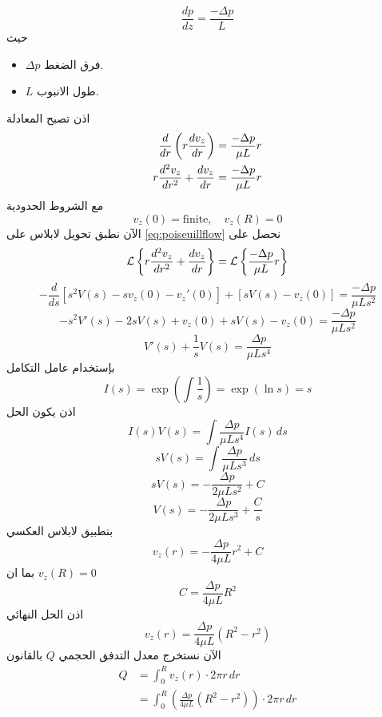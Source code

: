 \[
\frac{dp}{dz} = \frac{- \Delta p}{L}
\]
حيث 
\begin{itemize}
	\item $\Delta p$ فرق الضغط.
	\item  $L$ طول الانبوب.
\end{itemize}
اذن تصبح المعادلة 
\begin{align}
	\frac{d}{dr} \left(r \frac{dv_z}{dr}\right) = \frac{-\Delta p}{\mu L} r \notag\\
		\label{eq:poiseuillflow}
		r \frac{d^2 v_z}{dr^2} + \frac{dv_z}{dr} =  \frac{-\Delta p}{\mu L} r 
\end{align}
مع الشروط الحدودية
\[
v_z(0) = \text{finite}, \quad v_z(R) = 0
\]
الآن نطبق تحويل لابلاس على \eqref{eq:poiseuillflow} نحصل على
\[
\mathcal{L}\left\{r \frac{d^2 v_z}{dr^2} + \frac{dv_z}{dr}\right\} = \mathcal{L}\left\{\frac{-\Delta p}{\mu L} r\right\}
\]
\[
-\frac{d}{ds} \left[s^2 V(s) - s v_z(0) - v_z'(0)\right] + \left[sV(s) - v_z(0)\right] =  \frac{-\Delta p}{\mu L s^2}
\]
\[
-s^2V'(s) -2s V(s) + v_z(0) + sV(s) - v_z(0) = \frac{-\Delta p}{\mu L s^2}
\]
\[
V'(s) + \frac{1}{s} V(s) = \frac{\Delta p}{\mu L s^4}
\]
بإستخدام عامل التكامل 
\[
I(s) = \exp\left(\int \frac{1}{s}\right) = \exp(\ln s) = s
\]
اذن يكون الحل
\[
I(s) V(s) = \int  \frac{\Delta p}{\mu L s^4} I(s)\, ds
\]
\[
s V(s) = \int \frac{\Delta p}{\mu L s^3} \, ds
\]
\[
s V(s) = -\frac{\Delta p}{2\mu L s^2} + C
\]
\[
V(s) = -\frac{\Delta p}{2\mu L s^3} + \frac{C}{s}
\]
بتطبيق لابلاس العكسي
\[
v_z(r) = - \frac{\Delta p}{4\mu L } r^2 + C
\]
بما ان $v_z(R) = 0 $
\[
C = \frac{\Delta p}{4\mu L } R^2
\]
اذن الحل النهائي
\[
v_z(r) = \frac{\Delta p}{4\mu L } (R^2 - r^2)
\]
الآن نستخرج معدل التدفق الحجمي $Q$ بالقانون
\begin{align*}
	Q &= \int_0^R v_z(r) \cdot 2\pi r \, dr\\
	&= \int_{0}^{R} \left(\frac{\Delta p}{4\mu L } (R^2 - r^2)\right)\cdot 2\pi r\, dr
\end{align*}

